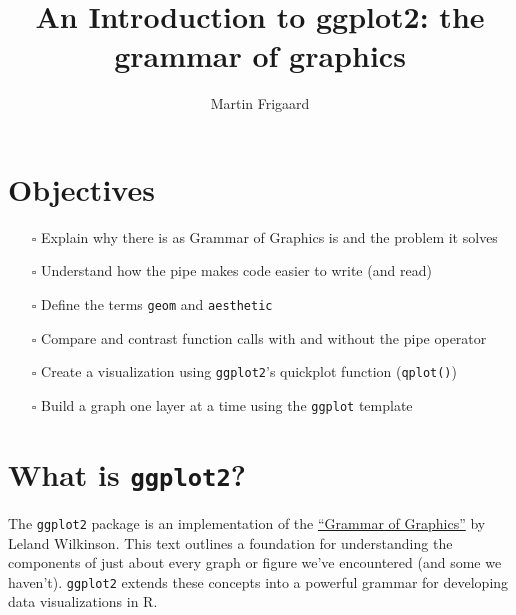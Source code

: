 \documentclass[letterpaper,12pt,twoside,]{pinp}
\title{An Introduction to ggplot2: the grammar of graphics}
\author[a]{Martin Frigaard}
\affil[a]{CSU, Chico}
\begin{document}
\verticaladjustment{-2pt}

\maketitle
\thispagestyle{firststyle}



\hypertarget{objectives}{%
\section{Objectives}\label{objectives}}

\begin{itemize}
\item[$\square$]
  Explain why there is as Grammar of Graphics is and the problem it
  solves
\item[$\square$]
  Understand how the pipe makes code easier to write (and read)
\item[$\square$]
  Define the terms \texttt{geom} and \texttt{aesthetic}
\item[$\square$]
  Compare and contrast function calls with and without the pipe operator
\item[$\square$]
  Create a visualization using \texttt{ggplot2}'s quickplot function
  (\texttt{qplot()})
\item[$\square$]
  Build a graph one layer at a time using the \texttt{ggplot} template
\end{itemize}

\hypertarget{what-is-ggplot2}{%
\section{\texorpdfstring{What is
\texttt{ggplot2}?}{What is ggplot2?}}\label{what-is-ggplot2}}

The \texttt{ggplot2} package is an implementation of the
\href{https://amzn.to/2MRRCAB}{``Grammar of Graphics''} by Leland
Wilkinson. This text outlines a foundation for understanding the
components of just about every graph or figure we've encountered (and
some we haven't). \texttt{ggplot2} extends these concepts into a
powerful grammar for developing data visualizations in R.
\end{document}
